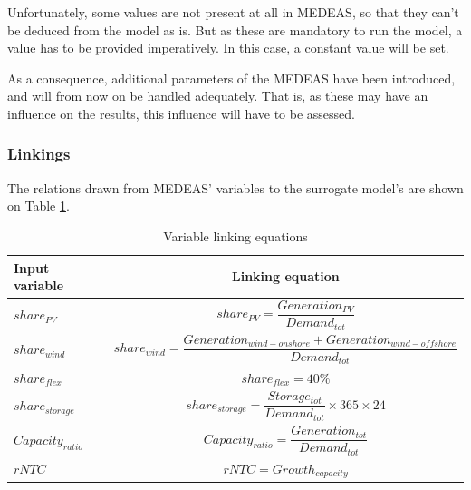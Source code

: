 Unfortunately, some values are not present at all in MEDEAS, so that they can't be deduced from the model as is. But as these are mandatory to run the model, a value has to be provided imperatively. In this case, a constant value will be set.

As a consequence, additional parameters of the MEDEAS have been introduced, and will from now on be handled adequately. That is, as these may have an influence on the results, this influence will have to be assessed.

\subsubsection{Linkings}

The relations drawn from MEDEAS' variables to the surrogate model's are shown on Table \ref{tab:linking-equations}.

\begin{table}[htb]
      \centering
      \begin{tabular}{|m{3.6cm}|c|}
      \hline 
      Input variable & Linking equation \\ \hline
       $share_{PV}$ & $share_{PV}=\dfrac{Generation_{PV}}{Demand_{tot}}$ \\ \hline 
       $share_{wind}$ & $share_{wind}=\dfrac{Generation_{wind-onshore} + Generation_{wind-offshore}}{Demand_{tot}}$ \\ \hline 
       $share_{flex}$ & $share_{flex}=40\%$ \\ \hline 
       $share_{storage}$ & $share_{storage}=\dfrac{Storage_{tot}}{Demand_{tot}}\times 365\times 24$ \\ \hline 
       $Capacity_{ratio}$ & $Capacity_{ratio}=\dfrac{Generation_{tot}}{Demand_{tot}}$ \\ \hline 
       $rNTC$ & $rNTC= Growth_{capacity}$ \\ \hline 
      \end{tabular}
      \caption{Variable linking equations}
      \label{tab:linking-equations}
    \end{table}

